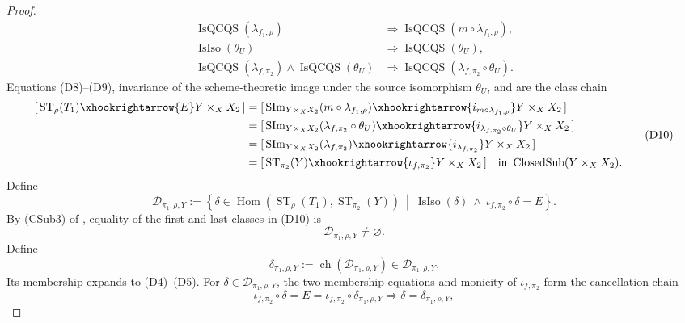 \begin{proof}
\[\begin{aligned}
      \operatorname{IsQCQS}(\lambda_{f_1,\rho})
      &\Longrightarrow
        \operatorname{IsQCQS}(m\circ\lambda_{f_1,\rho}),\\
    \operatorname{IsIso}(\theta_U)
      &\Longrightarrow\operatorname{IsQCQS}(\theta_U),\\
    \operatorname{IsQCQS}(\lambda_{f,\pi_2})\wedge
      \operatorname{IsQCQS}(\theta_U)
      &\Longrightarrow
        \operatorname{IsQCQS}(\lambda_{f,\pi_2}\circ\theta_U).
  \end{aligned}                                                     \tag{D9b}
  \]
  Equations
  (D8)--(D9), invariance of the scheme-theoretic image under the source
  isomorphism $\theta_U$, and  are the
  class chain
  \[
  \begin{aligned}
    [\,\operatorname{ST}_{\rho}(T_1)
      \xhookrightarrow{E}Y\times_XX_2\,]
      &=[\,\operatorname{SIm}_{Y\times_XX_2}
          (m\circ\lambda_{f_1,\rho})
        \xhookrightarrow{i_{m\circ\lambda_{f_1,\rho}}}
          Y\times_XX_2\,]\\
      &=[\,\operatorname{SIm}_{Y\times_XX_2}
          (\lambda_{f,\pi_2}\circ\theta_U)
        \xhookrightarrow{i_{\lambda_{f,\pi_2}\circ\theta_U}}
          Y\times_XX_2\,]\\
      &=[\,\operatorname{SIm}_{Y\times_XX_2}(\lambda_{f,\pi_2})
        \xhookrightarrow{i_{\lambda_{f,\pi_2}}}Y\times_XX_2\,]\\
      &=[\,\operatorname{ST}_{\pi_2}(Y)
        \xhookrightarrow{\iota_{f,\pi_2}}Y\times_XX_2\,]
      \quad\text{in }\operatorname{ClosedSub}(Y\times_XX_2).
  \end{aligned}                                                     \tag{D10}
  \]
  Define
  \[
    \mathscr D_{\pi_1,\rho,Y}:=
      \left\{\delta\in
        \operatorname{Hom}(\operatorname{ST}_{\rho}(T_1),
          \operatorname{ST}_{\pi_2}(Y))
        \ \middle|\
        \operatorname{IsIso}(\delta)\ \wedge\
        \iota_{f,\pi_2}\circ\delta=E\right\}.
  \]
  By (CSub3) of , equality of the
  first and last classes in (D10) is
  \[
    \mathscr D_{\pi_1,\rho,Y}\ne\varnothing.
  \]
  Define
  \[
    \delta_{\pi_1,\rho,Y}:=
      \operatorname{ch}(\mathscr D_{\pi_1,\rho,Y})
      \in\mathscr D_{\pi_1,\rho,Y}.
  \]
  Its membership expands to (D4)--(D5).  For
  $\delta\in\mathscr D_{\pi_1,\rho,Y}$, the two membership equations and
  monicity of $\iota_{f,\pi_2}$ form the cancellation chain
  \[
    \iota_{f,\pi_2}\circ\delta=E
      =\iota_{f,\pi_2}\circ\delta_{\pi_1,\rho,Y}
      \Longrightarrow\delta=\delta_{\pi_1,\rho,Y},
  \]
\end{proof}

